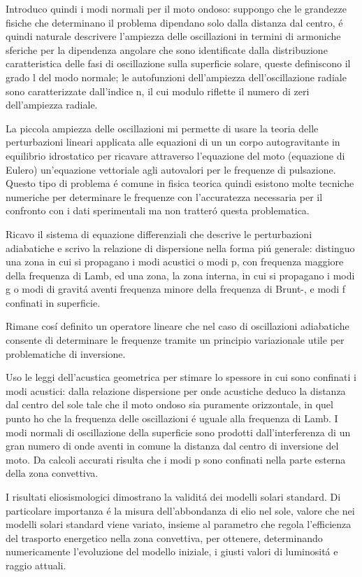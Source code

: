 Introduco quindi i modi normali per il moto ondoso: suppongo che le grandezze fisiche che determinano il problema dipendano solo dalla distanza dal centro, \'e quindi naturale descrivere l'ampiezza delle oscillazioni  in termini di armoniche sferiche per la dipendenza angolare che sono identificate dalla distribuzione caratteristica delle fasi di oscillazione sulla superficie solare, queste definiscono il grado l del modo normale; le autofunzioni dell'ampiezza dell'oscillazione radiale sono caratterizzate dall'indice n, il cui modulo riflette il numero di zeri dell'ampiezza radiale.

La piccola ampiezza delle oscillazioni mi permette di usare la teoria delle perturbazioni lineari applicata alle equazioni di un un corpo autogravitante in equilibrio idrostatico per ricavare attraverso l'equazione del moto (equazione di Eulero) un'equazione vettoriale agli autovalori per le frequenze di pulsazione. Questo tipo di problema \'e comune in fisica teorica quindi esistono molte tecniche numeriche per determinare le frequenze con l'accuratezza necessaria per il confronto con i dati sperimentali ma non tratter\'o questa problematica.


Ricavo il sistema di equazione differenziali che descrive le perturbazioni adiabatiche e scrivo la relazione di dispersione nella forma pi\'u generale: distinguo una zona in cui si propagano i modi acustici o modi p, con frequenza maggiore della frequenza di Lamb, ed una zona, la zona interna, in cui si propagano i modi g o modi di gravit\'a aventi frequenza minore della frequenza di Brunt-\vai{}, e modi f confinati in superficie. 


Rimane cos\'i definito un operatore lineare che nel caso di oscillazioni adiabatiche consente di determinare le frequenze tramite un principio variazionale utile per problematiche di inversione. 

Uso le leggi dell'acustica geometrica per stimare lo spessore in cui sono confinati i modi acustici: dalla relazione dispersione per onde acustiche deduco la distanza dal centro del sole tale che il moto ondoso sia puramente orizzontale, in quel punto ho che la frequenza delle oscillazioni \'e uguale alla frequenza di Lamb. I modi normali di oscillazione della superficie sono prodotti dall'interferenza di un gran numero di onde aventi in comune la distanza dal centro di inversione del moto. Da calcoli accurati risulta che i modi p sono confinati nella parte esterna della zona convettiva. 

I risultati eliosismologici dimostrano la validit\'a dei modelli solari standard. Di particolare importanza \'e la  misura  dell'abbondanza di elio nel sole, valore che nei modelli solari standard viene variato, insieme al parametro che regola l'efficienza del trasporto energetico nella zona convettiva, per ottenere, determinando numericamente l'evoluzione del modello iniziale, i giusti valori di luminosit\'a e raggio attuali.

